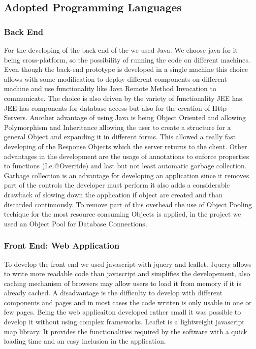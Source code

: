 \subsection{Adopted Programming Languages}
\subsubsection{Back End}
For the developing of the back-end of the we used Java.
We choose java for it being cross-platform, so the possibility of running the code on different machines. Even though the back-end prototype is developed in a single machine this choice allows with some modification to deploy different components on different machine and use functionality like Java Remote Method Invocation to communicate. The choice is also driven by the variety of functionality JEE has. JEE has components for database access but also for the creation of Http Servers.
Another advantage of using Java is being Object Oriented and allowing Polymorphism and Inheritance allowing the user to create a structure for a general Object and expanding it in different forms. This allowed a really fast developing of the Response Objects which the server returns to the client.
Other advantages in the development are the usage of annotations to enforce properties to functions (I.e.@Override) and last but not least automatic garbage collection.
Garbage collection is an advantage for developing an application since it removes part of the controls the developer must perform it also adds a considerable drawback of slowing down the application if object are created and than discarded continuously.
To remove part of this overhead the use of Object Pooling techique for the most resource consuming Objects is applied, in the project we used an Object Pool for Database Connections. 

\subsubsection{Front End: Web Application}
To develop the front end we used javascript with jquery and leaflet.
Jquery allows to write more readable code than javascript and simplifies the developement, also caching mechanism of browsers may 
allow users to load it from memory if it is already cached. A disadvantage is the difficulty to develop with different components and pages and in most cases the code written is only usable in one or few pages. Being the web applicaiton developed rather small it was possible to develop it without using complex frameworks.
Leaflet is a lightweight javascript map library. It provides the functionalities required by the software with a quick loading time and an easy inclusion in the application.


